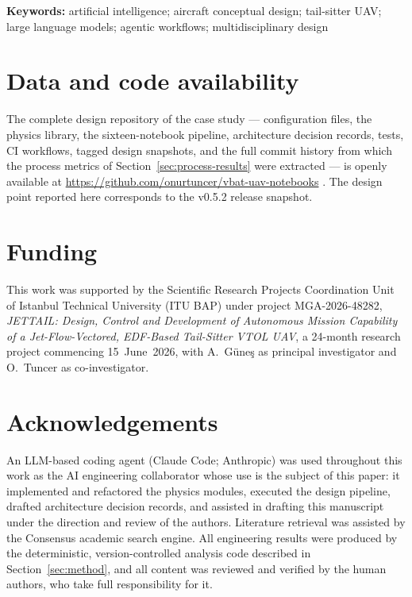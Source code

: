\documentclass[11pt,a4paper]{article}
\begin{document}
\noindent\textbf{Keywords:} artificial intelligence; aircraft
conceptual design; tail-sitter UAV; large language models; agentic
workflows; multidisciplinary design








\section*{Data and code availability}
The complete design repository of the case study --- configuration
files, the physics library, the sixteen-notebook pipeline, architecture
decision records, tests, CI workflows, tagged design snapshots, and the
full commit history from which the process metrics of
Section~\ref{sec:process-results} were extracted --- is openly
available at \url{https://github.com/onurtuncer/vbat-uav-notebooks}
\citep{tuncer2026vbat}. The design point reported here corresponds to
the v0.5.2 release snapshot.

\section*{Funding}
This work was supported by the Scientific Research Projects
Coordination Unit of Istanbul Technical University (ITU BAP) under project
MGA-2026-48282, \emph{JETTAIL: Design, Control and Development of
Autonomous Mission Capability of a Jet-Flow-Vectored, EDF-Based
Tail-Sitter VTOL UAV}, a 24-month research project commencing
15~June~2026, with A.~G\"une\c{s} as principal investigator and
O.~Tuncer as co-investigator.

\section*{Acknowledgements}
An LLM-based coding agent (Claude Code; Anthropic) was used throughout
this work as the AI engineering collaborator whose use is the subject
of this paper: it implemented and refactored the physics modules,
executed the design pipeline, drafted architecture decision records,
and assisted in drafting this manuscript under the direction and review
of the authors. Literature retrieval was assisted by the Consensus
academic search engine. All engineering results were produced by the
deterministic, version-controlled analysis code described in
Section~\ref{sec:method}, and all content was reviewed and verified by
the human authors, who take full responsibility for it.



\end{document}
